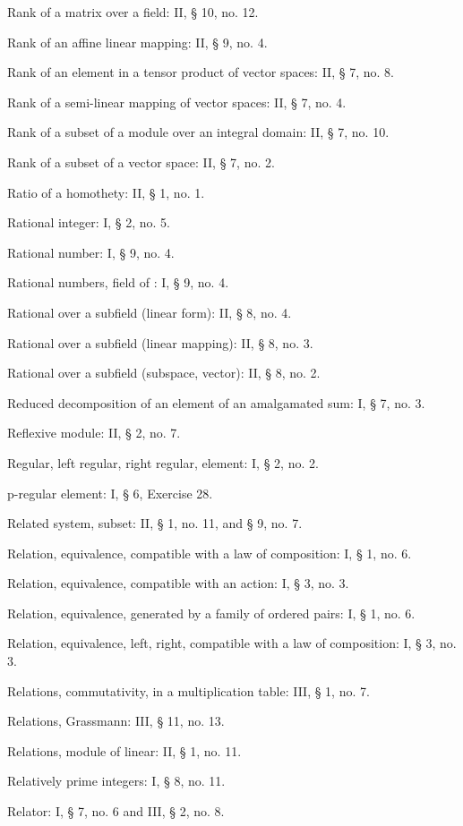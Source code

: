 Rank of a matrix over a field: II, § 10, no. 12.

Rank of an affine linear mapping: II, § 9, no. 4.

Rank of an element in a tensor product of vector spaces: II, § 7, no. 8.

Rank of a semi-linear mapping of vector spaces: II, § 7, no. 4.

Rank of a subset of a module over an integral domain: II, § 7, no. 10.

Rank of a subset of a vector space: II, § 7, no. 2.

Ratio of a homothety: II, § 1, no. 1.

Rational integer: I, § 2, no. 5.

Rational number: I, § 9, no. 4.

Rational numbers, field of : I, § 9, no. 4.

Rational over a subfield (linear form): II, § 8, no. 4.

Rational over a subfield (linear mapping): II, § 8, no. 3.

Rational over a subfield (subspace, vector): II, § 8, no. 2.

Reduced decomposition of an element of an amalgamated sum: I, § 7, no. 3.

Reflexive module: II, § 2, no. 7.

Regular, left regular, right regular, element: I, § 2, no. 2.

p-regular element: I, § 6, Exercise 28.

Related system, subset: II, § 1, no. 11, and § 9, no. 7.

Relation, equivalence, compatible with a law of composition: I, § 1, no. 6.

Relation, equivalence, compatible with an action: I, § 3, no. 3.

Relation, equivalence, generated by a family of ordered pairs: I, § 1, no. 6.

Relation, equivalence, left, right, compatible with a law of composition: I, § 3, no. 3.

Relations, commutativity, in a multiplication table: III, § 1, no. 7.

Relations, Grassmann: III, § 11, no. 13.

Relations, module of linear: II, § 1, no. 11.

Relatively prime integers: I, § 8, no. 11.

Relator: I, § 7, no. 6 and III, § 2, no. 8.

